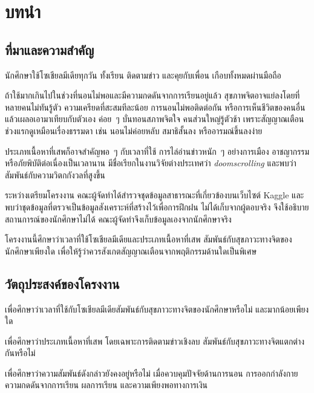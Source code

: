 \chapter{บทนำ}

\section{ที่มาและความสำคัญ}

นักศึกษาใช้โซเชียลมีเดียทุกวัน ทั้งเรียน ติดตามข่าว และคุยกับเพื่อน
เกือบทั้งหมดผ่านมือถือ

ถ้าใช้มากเกินไปในช่วงที่นอนไม่พอและมีความกดดันจากการเรียนอยู่แล้ว
สุขภาพจิตอาจแย่ลงโดยที่หลายคนไม่ทันรู้ตัว
ความเครียดที่สะสมทีละน้อย การนอนไม่พอติดต่อกัน
หรือการเห็นชีวิตของคนอื่นแล้วเผลอเอามาเทียบกับตัวเอง ค่อย~ๆ บั่นทอนสภาพจิตใจ
คนส่วนใหญ่รู้ตัวช้า เพราะสัญญาณเตือนช่วงแรกดูเหมือนเรื่องธรรมดา
เช่น นอนไม่ค่อยหลับ สมาธิสั้นลง หรืออารมณ์ขึ้นลงง่าย

ประเภทเนื้อหาที่เสพก็อาจสำคัญพอ~ๆ กับเวลาที่ใช้
การไล่อ่านข่าวหนัก~ๆ อย่างการเมือง อาชญากรรม หรือภัยพิบัติต่อเนื่องเป็นเวลานาน
มีชื่อเรียกในงานวิจัยต่างประเทศว่า \textit{doomscrolling}
และพบว่าสัมพันธ์กับความวิตกกังวลที่สูงขึ้น \cite{dominguez2025climate}

ระหว่างเตรียมโครงงาน คณะผู้จัดทำได้สำรวจชุดข้อมูลสาธารณะที่เกี่ยวข้องบนเว็บไซต์ \mbox{Kaggle}
\cite{singh_student_social_media,singh_social_media_addiction}
และพบว่าชุดข้อมูลที่ตรวจเป็นข้อมูลสังเคราะห์ที่สร้างไว้เพื่อการฝึกฝน ไม่ได้เก็บจากผู้ตอบจริง
จึงใช้อธิบายสถานการณ์ของนักศึกษาไม่ได้ คณะผู้จัดทำจึงเก็บข้อมูลเองจากนักศึกษาจริง

โครงงานนี้ศึกษาว่าเวลาที่ใช้โซเชียลมีเดียและประเภทเนื้อหาที่เสพ
สัมพันธ์กับสุขภาวะทางจิตของนักศึกษาเพียงใด
เพื่อให้รู้ว่าควรสังเกตสัญญาณเตือนจากพฤติกรรมด้านใดเป็นพิเศษ

\section{วัตถุประสงค์ของโครงงาน}

\begin{subitems}
    \item เพื่อศึกษาว่าเวลาที่ใช้กับโซเชียลมีเดียสัมพันธ์กับสุขภาวะทางจิตของนักศึกษาหรือไม่ และมากน้อยเพียงใด
    \item เพื่อศึกษาว่าประเภทเนื้อหาที่เสพ โดยเฉพาะการติดตามข่าวเชิงลบ สัมพันธ์กับสุขภาวะทางจิตแตกต่างกันหรือไม่
    \item เพื่อศึกษาว่าความสัมพันธ์ดังกล่าวยังคงอยู่หรือไม่ เมื่อควบคุมปัจจัยด้านการนอน การออกกำลังกาย ความกดดันจากการเรียน ผลการเรียน และความเพียงพอทางการเงิน
\end{subitems}

